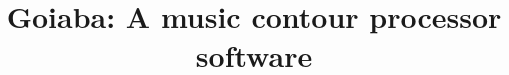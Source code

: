 \documentclass{article}
\title{Goiaba: A music contour processor software}
\begin{document}
\graphicspath{{figs/}{data/}}
\maketitle

\begin{abstract}
  
\end{abstract}





\end{document}
